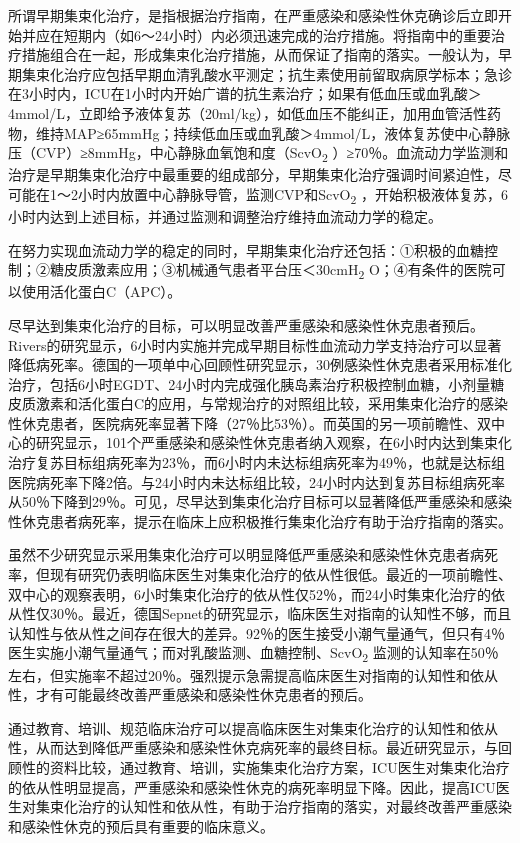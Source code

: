 所谓早期集束化治疗，是指根据治疗指南，在严重感染和感染性休克确诊后立即开始并应在短期内（如6～24小时）内必须迅速完成的治疗措施。将指南中的重要治疗措施组合在一起，形成集束化治疗措施，从而保证了指南的落实。一般认为，早期集束化治疗应包括早期血清乳酸水平测定；抗生素使用前留取病原学标本；急诊在3小时内，ICU在1小时内开始广谱的抗生素治疗；如果有低血压或血乳酸＞4mmol/L，立即给予液体复苏（20ml/kg），如低血压不能纠正，加用血管活性药物，维持MAP≥65mmHg；持续低血压或血乳酸＞4mmol/L，液体复苏使中心静脉压（CVP）≥8mmHg，中心静脉血氧饱和度（ScvO\textsubscript{2}
）≥70％。血流动力学监测和治疗是早期集束化治疗中最重要的组成部分，早期集束化治疗强调时间紧迫性，尽可能在1～2小时内放置中心静脉导管，监测CVP和ScvO\textsubscript{2}
，开始积极液体复苏，6小时内达到上述目标，并通过监测和调整治疗维持血流动力学的稳定。

在努力实现血流动力学的稳定的同时，早期集束化治疗还包括：①积极的血糖控制；②糖皮质激素应用；③机械通气患者平台压＜30cmH\textsubscript{2}
O；④有条件的医院可以使用活化蛋白C（APC）。

尽早达到集束化治疗的目标，可以明显改善严重感染和感染性休克患者预后。Rivers的研究显示，6小时内实施并完成早期目标性血流动力学支持治疗可以显著降低病死率。德国的一项单中心回顾性研究显示，30例感染性休克患者采用标准化治疗，包括6小时EGDT、24小时内完成强化胰岛素治疗积极控制血糖，小剂量糖皮质激素和活化蛋白C的应用，与常规治疗的对照组比较，采用集束化治疗的感染性休克患者，医院病死率显著下降（27％比53％）。而英国的另一项前瞻性、双中心的研究显示，101个严重感染和感染性休克患者纳入观察，在6小时内达到集束化治疗复苏目标组病死率为23％，而6小时内未达标组病死率为49％，也就是达标组医院病死率下降2倍。与24小时内未达标组比较，24小时内达到复苏目标组病死率从50％下降到29％。可见，尽早达到集束化治疗目标可以显著降低严重感染和感染性休克患者病死率，提示在临床上应积极推行集束化治疗有助于治疗指南的落实。

虽然不少研究显示采用集束化治疗可以明显降低严重感染和感染性休克患者病死率，但现有研究仍表明临床医生对集束化治疗的依从性很低。最近的一项前瞻性、双中心的观察表明，6小时集束化治疗的依从性仅52％，而24小时集束化治疗的依从性仅30％。最近，德国Sepnet的研究显示，临床医生对指南的认知性不够，而且认知性与依从性之间存在很大的差异。92％的医生接受小潮气量通气，但只有4％医生实施小潮气量通气；而对乳酸监测、血糖控制、ScvO\textsubscript{2}
监测的认知率在50％左右，但实施率不超过20％。强烈提示急需提高临床医生对指南的认知性和依从性，才有可能最终改善严重感染和感染性休克患者的预后。

通过教育、培训、规范临床治疗可以提高临床医生对集束化治疗的认知性和依从性，从而达到降低严重感染和感染性休克病死率的最终目标。最近研究显示，与回顾性的资料比较，通过教育、培训，实施集束化治疗方案，ICU医生对集束化治疗的依从性明显提高，严重感染和感染性休克的病死率明显下降。因此，提高ICU医生对集束化治疗的认知性和依从性，有助于治疗指南的落实，对最终改善严重感染和感染性休克的预后具有重要的临床意义。


